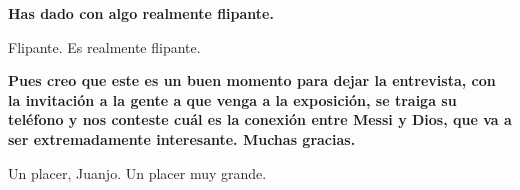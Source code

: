 \documentclass[11pt,a4paper]{article}
\newcommand{\preg}[1]{\textbf{#1}}
\begin{document}
\preg{Has dado con algo realmente flipante.}

Flipante. Es realmente flipante.

\preg{Pues creo que este es un buen momento para dejar la entrevista, con la invitación a la gente a que venga a la exposición, se traiga su teléfono y nos conteste cuál es la conexión entre Messi y Dios, que va a ser extremadamente interesante. Muchas gracias.}

Un placer, Juanjo. Un placer muy grande.
\end{document}

